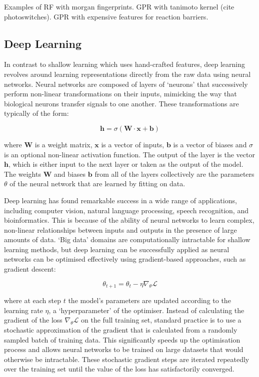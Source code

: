Examples of RF with morgan fingerprints. GPR with tanimoto kernel (cite photoswitches). GPR with expensive features for reaction barriers.

\subsection{Deep Learning}

In contrast to shallow learning which uses hand-crafted features, deep learning revolves around learning representations directly from the raw data using neural networks. Neural networks are composed of layers of `neurons' that successively perform non-linear transformations on their inputs, mimicking the way that biological neurons transfer signals to one another. These transformations are typically of the form:

\begin{equation}
    \textbf{h} = \sigma(\mathbf{W} \cdot \mathbf{x} + \mathbf{b})
\end{equation}

where $\mathbf{W}$ is a weight matrix, $\mathbf{x}$ is a vector of inputs, $\mathbf{b}$ is a vector of biases and $\sigma$ is an optional non-linear activation function. The output of the layer is the vector $\mathbf{h}$, which is either input to the next layer or taken as the output of the model. The weights $\mathbf{W}$ and biases $\mathbf{b}$ from all of the layers collectively are the parameters $\theta$ of the neural network that are learned by fitting on data.

Deep learning has found remarkable success in a wide range of applications, including computer vision, natural language processing, speech recognition, and bioinformatics. This is because of the ability of neural networks to learn complex, non-linear relationships between inputs and outputs in the presence of large amounts of data. `Big data' domains are computationally intractable for shallow learning methods, but deep learning can be successfully applied as neural networks can be optimised effectively using  gradient-based approaches, such as gradient descent:

\begin{equation}
    \theta_{t+1} = \theta_t - \eta \nabla_{\theta} \mathcal{L}
\end{equation}

where at each step $t$ the model's parameters are updated according to the learning rate $\eta$, a `hyperparameter' of the optimiser. Instead of calculating the gradient of the loss $\nabla_{\theta}\mathcal{L}$ on the full training set, standard practice is to use a stochastic approximation of the gradient that is calculated from a randomly sampled batch of training data. This significantly speeds up the optimisation process and allows neural networks to be trained on large datasets that would otherwise be intractable. These stochastic gradient steps are iterated repeatedly over the training set until the value of the loss has satisfactorily converged. 

